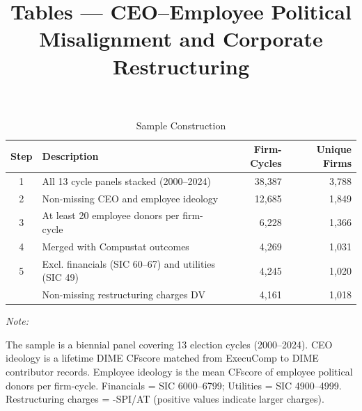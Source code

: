 \documentclass[
  10pt,
]{article}
\title{Tables --- CEO--Employee Political Misalignment and Corporate
Restructuring}
\author{}
\date{\vspace{-2.5em}}
\begin{document}
\maketitle

\begin{table}[!h]
\centering
\caption{\label{tab:table1}Sample Construction}
\centering
\fontsize{9}{11}\selectfont
\begin{threeparttable}
\begin{tabular}[t]{clrr}
\toprule
Step & Description & Firm-Cycles & Unique Firms\\
\midrule
1 & All 13 cycle panels stacked (2000--2024) & 38,387 & 3,788\\
2 & Non-missing CEO and employee ideology & 12,685 & 1,849\\
3 & At least 20 employee donors per firm-cycle & 6,228 & 1,366\\
4 & Merged with Compustat outcomes & 4,269 & 1,031\\
5 & Excl. financials (SIC 60--67) and utilities (SIC 49) & 4,245 & 1,020\\
\addlinespace
6 & Non-missing restructuring charges DV & 4,161 & 1,018\\
\bottomrule
\end{tabular}
\begin{tablenotes}[para]
\item \textit{Note: } 
\item The sample is a biennial panel covering 13 election cycles (2000--2024). CEO ideology is a lifetime DIME CFscore matched from ExecuComp to DIME contributor records. Employee ideology is the mean CFscore of employee political donors per firm-cycle. Financials = SIC 6000--6799; Utilities = SIC 4900--4999. Restructuring charges = -SPI/AT (positive values indicate larger charges).
\end{tablenotes}
\end{threeparttable}
\end{table}

\newpage
\end{document}
